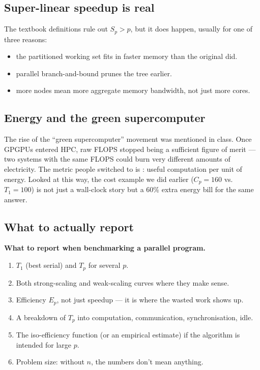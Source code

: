 \subsection{Super-linear speedup is real}

The textbook definitions rule out $S_p > p$, but it does happen, usually
for one of three reasons:
\begin{itemize}
  \item {} the partitioned working set fits in faster memory
        than the original did.
  \item {} parallel branch-and-bound prunes the tree earlier.
  \item {} more nodes mean more aggregate memory
        bandwidth, not just more cores.
\end{itemize}

\subsection{Energy and the green supercomputer}

The rise of the ``green supercomputer'' movement was mentioned in class.
Once GPGPUs entered HPC, raw FLOPS stopped being a sufficient figure of
merit --- two systems with the same FLOPS could burn very different
amounts of electricity. The metric people switched to is
: useful computation per unit of energy. Looked at
this way, the cost example we did earlier ($C_p = 160$ vs.\ $T_1 = 100$)
is not just a wall-clock story but a $60\%$ extra energy bill for the same
answer.

\subsection{What to actually report}

\begin{ppkey}
\textbf{What to report when benchmarking a parallel program.}
\begin{enumerate}
  \item $T_1$ (best serial) and $T_p$ for several $p$.
  \item Both strong-scaling and weak-scaling curves where they make sense.
  \item Efficiency $E_p$, not just speedup --- it is where the wasted
        work shows up.
  \item A breakdown of $T_p$ into computation, communication,
        synchronisation, idle.
  \item The iso-efficiency function (or an empirical estimate) if the
        algorithm is intended for large $p$.
  \item Problem size: without $n$, the numbers don't mean anything.
\end{enumerate}
\end{ppkey}


